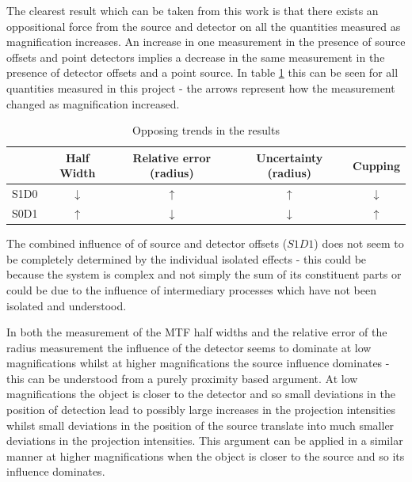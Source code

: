 \documentclass[
  twoside,
  11pt, a4paper,
  footinclude=true,
  headinclude=true,
  cleardoublepage=empty
]{scrbook}
\begin{document}
The clearest result which can be taken from this work is that there exists an oppositional force from the source and detector on all the quantities measured as magnification increases. An increase in one measurement in the presence of source offsets and point detectors implies a decrease in the same measurement in the presence of detector offsets and a point source. In table \ref{upsanddowns} this can be seen for all quantities measured in this project - the arrows represent how the measurement changed as magnification increased.

\begin{table}
\caption{Opposing trends in the results}
\label{upsanddowns}
\begin{tabular}{c|cccc}
\toprule
{}  &     Half Width &     Relative error (radius)  &  Uncertainty (radius) &  Cupping\\
\midrule
S1D0     &    $\downarrow$ & $\uparrow$ & $\uparrow$ & $\downarrow$ \\
S0D1     &    $\uparrow$ & $\downarrow$ & $\downarrow$ & $\uparrow$ \\
\bottomrule
\end{tabular}
\end{table}

The combined influence of of source and detector offsets ($S1D1$) does not seem to be completely determined by the individual isolated effects - this could be because the system is complex and not simply the sum of its constituent parts or could be due to the influence of intermediary processes which have not been isolated and understood.

In both the measurement of the MTF half widths and the relative error of the radius measurement the influence of the detector seems to dominate at low magnifications whilst at higher magnifications the source influence dominates - this can be understood from a purely proximity based argument. At low magnifications the object is closer to the detector and so small deviations in the position of detection lead to possibly large increases in the projection intensities whilst small deviations in the position of the source translate into much smaller deviations in the projection intensities. This argument can be applied in a similar manner at higher magnifications when the object is closer to the source and so its influence dominates.
\end{document}

